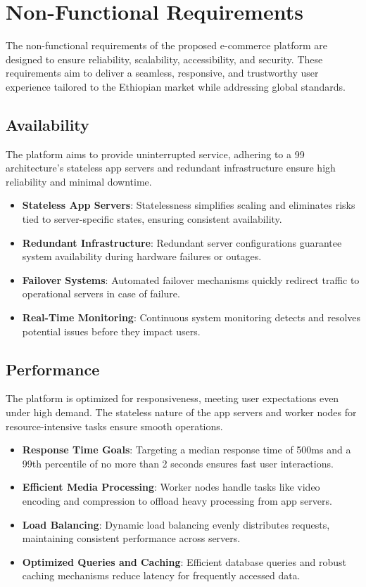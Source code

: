\documentclass[12pt]{report}
\begin{document}
\section{Non-Functional Requirements}

The non-functional requirements of the proposed e-commerce platform are designed to
ensure reliability, scalability, accessibility, and security. These requirements aim to deliver a
seamless, responsive, and trustworthy user experience tailored to the Ethiopian market while
addressing global standards.

\subsection{Availability}

The platform aims to provide uninterrupted service, adhering to a 99%
architecture's stateless app servers and redundant infrastructure ensure high reliability and
minimal downtime.

\begin{itemize}
	\item \textbf{Stateless App Servers}: Statelessness simplifies scaling and eliminates risks tied to
	      server-specific states, ensuring consistent availability.
	\item \textbf{Redundant Infrastructure}: Redundant server configurations guarantee system
	      availability during hardware failures or outages.
	\item \textbf{Failover Systems}: Automated failover mechanisms quickly redirect traffic to
	      operational servers in case of failure.
	\item \textbf{Real-Time Monitoring}: Continuous system monitoring detects and resolves potential
	      issues before they impact users.
\end{itemize}

\subsection{Performance}

The platform is optimized for responsiveness, meeting user expectations even under high
demand. The stateless nature of the app servers and worker nodes for resource-intensive tasks
ensure smooth operations.

\begin{itemize}
	\item \textbf{Response Time Goals}: Targeting a median response time of 500ms and a 99th
	      percentile of no more than 2 seconds ensures fast user interactions.
	\item \textbf{Efficient Media Processing}: Worker nodes handle tasks like video encoding and
	      compression to offload heavy processing from app servers.
	\item \textbf{Load Balancing}: Dynamic load balancing evenly distributes requests, maintaining
	      consistent performance across servers.
	\item \textbf{Optimized Queries and Caching}: Efficient database queries and robust caching
	      mechanisms reduce latency for frequently accessed data.
\end{itemize}
\end{document}
